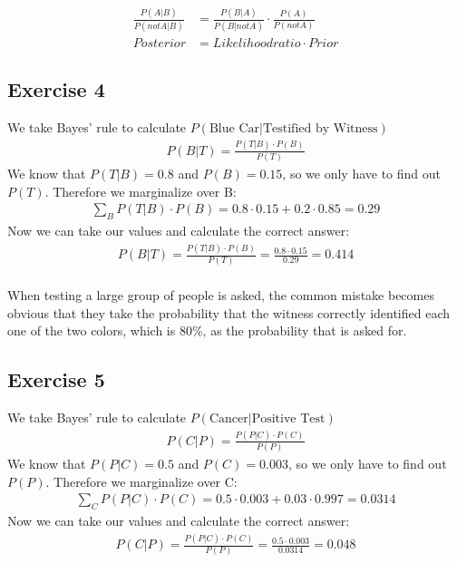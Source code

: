 \begin{align*}
\frac{P(A|B)}{P(not A|B)} & = \frac{P(B|A)}{P(B|not A)} \cdot \frac{P(A)}{P(not A)} \\
Posterior & = Likelihoodratio \cdot Prior
\end{align*}


\subsection*{Exercise 4}

We take Bayes' rule to calculate $P(\mbox{Blue Car}|\mbox{Testified by Witness})$
\begin{align*}
P(B|T) = \frac{P(T|B) \cdot P(B)}{P(T)}
\end{align*}
We know that $P(T|B) = 0.8$ and $P(B) = 0.15$, so we only have to find out $P(T)$. Therefore we marginalize over B:
\begin{align*}
\sum_{B}{P(T|B) \cdot P(B)} = 0.8 \cdot 0.15 + 0.2 \cdot 0.85 = 0.29
\end{align*}
Now we can take our values and calculate the correct answer:
\begin{align*}
P(B|T) = \frac{P(T|B) \cdot P(B)}{P(T)} = \frac{0.8 \cdot 0.15}{0.29} = 0.414
\end{align*}
\\
When testing a large group of people is asked, the common mistake becomes obvious that they take the probability that the witness correctly identified each one of the two colors, which is 80\%, as the probability that is asked for.

\setcounter{equation}{0}
\subsection*{Exercise 5}

We take Bayes' rule to calculate $P(\mbox{Cancer}|\mbox{Positive Test})$
\begin{align*}
P(C|P) = \frac{P(P|C) \cdot P(C)}{P(P)}
\end{align*}
We know that $P(P|C) = 0.5$ and $P(C) = 0.003$, so we only have to find out $P(P)$. Therefore we marginalize over C:
\begin{align*}
\sum_{C}{P(P|C) \cdot P(C)} = 0.5 \cdot 0.003 + 0.03 \cdot 0.997 = 0.0314
\end{align*}
Now we can take our values and calculate the correct answer:
\begin{align*}
P(C|P) = \frac{P(P|C) \cdot P(C)}{P(P)} = \frac{0.5 \cdot 0.003}{0.0314} = 0.048
\end{align*}

